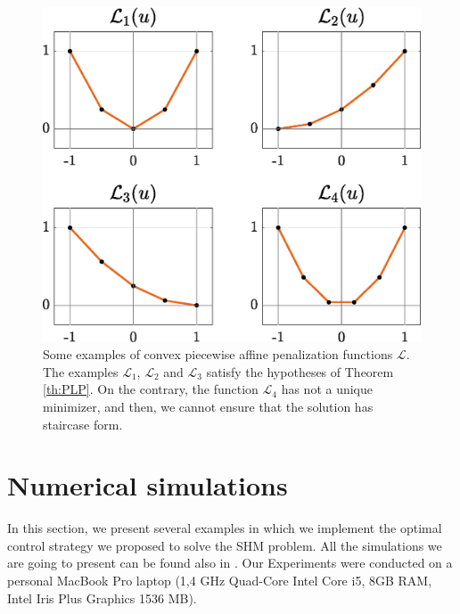\documentclass[twocolumn]{autart}    %
\begin{document}
\begin{figure}
	\centering
	\includegraphics[scale=0.35]{img/fig11.eps}
	\caption{Some examples of convex piecewise affine penalization functions $\mathcal{L}$. The examples $ \mathcal {L}_1 $, $ \mathcal{L}_2$ and $ \mathcal{L}_3 $ satisfy the hypotheses of Theorem \ref{th:PLP}. On the contrary,  the function $\mathcal{L}_4 $ has not a unique minimizer, and then, we cannot ensure that the solution has staircase form.}
	\label{fig:examples_penalizations}
\end{figure}

\section{Numerical simulations}\label{sec:Simulations}

In this section, we present several examples in which we implement the optimal control strategy we proposed to solve the SHM problem. All the simulations we are going to present can be found also in \cite{simus}. Our Experiments were conducted on a personal MacBook Pro laptop (1,4 GHz Quad-Core Intel Core i5, 8GB RAM, Intel Iris Plus Graphics 1536 MB). 
\end{document}
